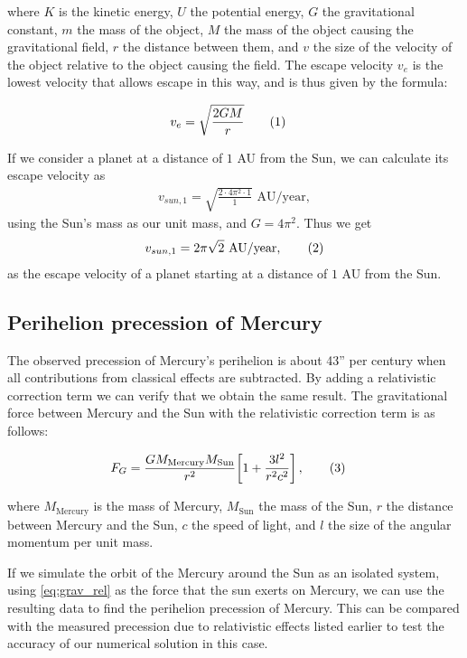 \documentclass[reprint,english,notitlepage]{revtex4-1}  %
\newcommand\numberthis{\addtocounter{equation}{1}\tag{\theequation}}
\begin{document}
where $K$ is the kinetic energy, $U$ the potential energy, $G$ the gravitational constant, $m$ the mass of the object, $M$ the mass of the object causing the gravitational field, $r$ the distance between them, and $v$ the size of the velocity of the object relative to the object causing the field. The escape velocity $v_e$ is the lowest velocity that allows escape in this way, and is thus given by the formula:

\begin{align*}
v_e &= \sqrt{\frac{2GM}{r}} \numberthis \label{eq:esc_vel}
\end{align*}

If we consider a planet at a distance of \(1\) AU from the Sun, we can calculate its escape velocity as
\begin{align*}
	v_{sun, 1} = \sqrt{\frac{2\cdot 4\pi^{2}\cdot 1}{1}} \text{ AU/year},
\end{align*}
using the Sun's mass as our unit mass, and \(G = 4\pi^{2}\). Thus we get
\begin{align*}
	v_{sun, 1} = 2\pi\sqrt{2}\text{ AU/year}, \numberthis \label{eq:esc_sun_1au}
\end{align*}
as the escape velocity of a planet starting at a distance of \(1\) AU from the Sun.

\subsection{Perihelion precession of Mercury} \label{sec:II:f}

The observed precession of Mercury's perihelion is about 43'' per century when all contributions from classical effects are subtracted. By adding a relativistic correction term we can verify that we obtain the same result. The gravitational force between Mercury and the Sun with the relativistic correction term is as follows:

\begin{align*}
F_G &= \frac{GM_\text{Mercury} M_\text{Sun}}{r^2} \bigg[ 1 + \frac{3l^2}{r^2 c^2}\bigg] \, , \numberthis \label{eq:grav_rel} 
\end{align*}

where $M_\text{Mercury}$ is the mass of Mercury, $M_\text{Sun}$ the mass of the Sun, $r$ the distance between Mercury and the Sun, $c$ the speed of light, and $l$ the size of the angular momentum per unit mass. 

If we simulate the orbit of the Mercury around the Sun as an isolated system, using \eqref{eq:grav_rel} as the force that the sun exerts on Mercury, we can use the resulting data to find the perihelion precession of Mercury. This can be compared with the measured precession due to relativistic effects listed earlier to test the accuracy of our numerical solution in this case. 
\end{document}
